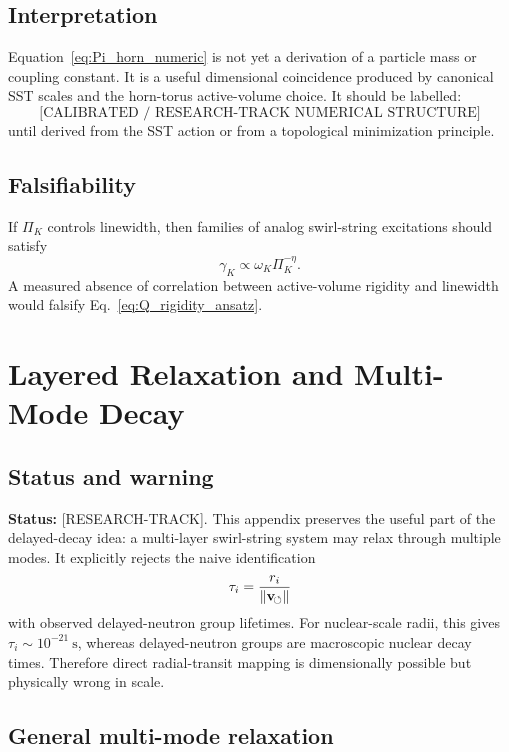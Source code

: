     \subsection*{Interpretation}
        
        Equation~\eqref{eq:Pi_horn_numeric} is not yet a derivation of a particle mass or coupling constant. It is a useful dimensional coincidence produced by canonical SST scales and the horn-torus active-volume choice. It should be labelled:
        \[
            \boxed{
                \text{[CALIBRATED / RESEARCH-TRACK NUMERICAL STRUCTURE]}
            }
        \]
        until derived from the SST action or from a topological minimization principle.
    
    \subsection*{Falsifiability}
        
        If \(\Pi_K\) controls linewidth, then families of analog swirl-string excitations should satisfy
        \[
            \gamma_K \propto \omega_K \Pi_K^{-\eta}.
        \]
        A measured absence of correlation between active-volume rigidity and linewidth would falsify Eq.~\eqref{eq:Q_rigidity_ansatz}.

\section{Layered Relaxation and Multi-Mode Decay}
    \label{app:layered-relaxation}
    
    \subsection*{Status and warning}
        
        \noindent
        \textbf{Status:} [RESEARCH-TRACK].
        This appendix preserves the useful part of the delayed-decay idea: a multi-layer swirl-string system may relax through multiple modes. It explicitly rejects the naive identification
        \[
            \tau_i = \frac{r_i}{\lVert\mathbf{v}_{\!\boldsymbol{\circlearrowleft}}\rVert}
        \]
        with observed delayed-neutron group lifetimes. For nuclear-scale radii, this gives \(\tau_i\sim 10^{-21}\ \mathrm{s}\), whereas delayed-neutron groups are macroscopic nuclear decay times. Therefore direct radial-transit mapping is dimensionally possible but physically wrong in scale.
    
    \subsection*{General multi-mode relaxation}
        
